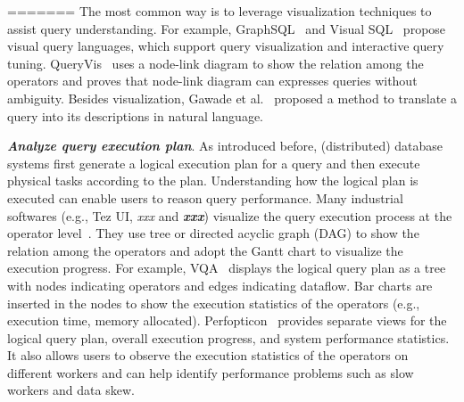 =======
The most common way is to leverage visualization techniques to assist query understanding.
For example, GraphSQL~\cite{cerullo2007system} and Visual SQL~\cite{jaakkola2003visual} propose visual query languages, which support query visualization and interactive query tuning.
QueryVis~\cite{leventidis2020queryvis} uses a node-link diagram to show the relation among the operators and proves that node-link diagram can expresses queries without ambiguity. Besides visualization, Gawade et al.~\cite{koutrika2010explaining} proposed a method to translate a query into its descriptions in natural language. 

\emph{\textbf{Analyze query execution plan}}. As introduced before, (distributed) database systems first generate a logical execution plan for a query and then execute physical tasks according to the plan. Understanding how the logical plan is executed can enable users to reason query performance. Many industrial softwares (e.g., Tez UI, \textit{xxx} and \textit{\textbf{xxx}}) visualize the query execution process at the operator level~\cite{tez-ui}. They use tree or directed acyclic graph (DAG) to show the relation among the operators and adopt the Gantt chart to visualize the execution progress. For example, VQA~\cite{simitsis2014vqa} displays the logical query plan as a tree with nodes indicating operators and edges indicating dataflow. Bar charts are inserted in the nodes to show the execution statistics of the operators (e.g., execution time, memory allocated). Perfopticon~\cite{moritz2015perfopticon} provides separate views for the logical query plan, overall execution progress, and system performance statistics. It also allows users to observe the execution statistics of the operators on different workers and can help identify performance problems such as slow workers and data skew. 

